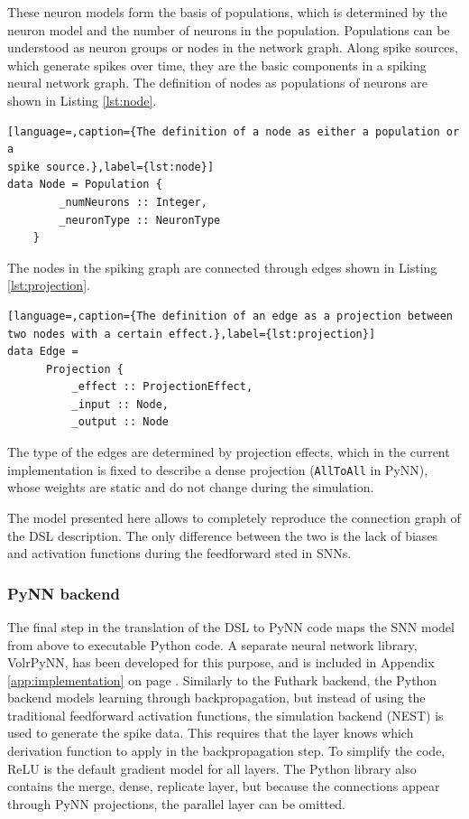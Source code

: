These neuron models form the basis of populations, which is determined by the
neuron model and the number of neurons in the population.
Populations can be understood as neuron groups or nodes in the network graph.
Along spike sources, which generate spikes over time, they are the 
basic components in a spiking neural network graph.
The definition of nodes as populations of neurons are shown in
Listing \ref{lst:node}.

\begin{lstlisting}[language=,caption={The definition of a node as either a population or a
spike source.},label={lst:node}]
data Node = Population {
        _numNeurons :: Integer,
        _neuronType :: NeuronType
    }
\end{lstlisting}

The nodes in the spiking graph are connected through edges shown in 
Listing \ref{lst:projection}.

\begin{lstlisting}[language=,caption={The definition of an edge as a projection between
two nodes with a certain effect.},label={lst:projection}]
data Edge =
      Projection {
          _effect :: ProjectionEffect,
          _input :: Node,
          _output :: Node
\end{lstlisting}

The type of the edges are determined by projection effects, which
in the current implementation is fixed to describe a 
dense projection (\texttt{AllToAll} in PyNN), whose weights are static and
do not change during the simulation.

The model presented here allows to completely reproduce the connection
graph of the \gls{DSL} description.
The only difference between the two is the lack of biases and activation functions
during the feedforward sted in \glspl{SNN}.

\subsubsection{PyNN backend}
The final step in the translation of the \gls{DSL} to PyNN code maps the
\gls{SNN} model from above to executable Python code.
A separate neural network library, VolrPyNN, has been developed for this purpose, and is included in Appendix \ref{app:implementation} on page
\pageref{app:implementation_volrpynn}.
Similarly to the Futhark backend, the Python backend models learning through
backpropagation, but instead of using the traditional feedforward activation
functions, the simulation backend (NEST) is used to generate the spike data.
This requires that the layer knows which derivation function to apply in
the backpropagation step.
To simplify the code, ReLU is the default gradient model for all layers.
The Python library also contains the merge, dense,
replicate layer, but because the connections appear through
PyNN projections, the parallel layer can be omitted.

